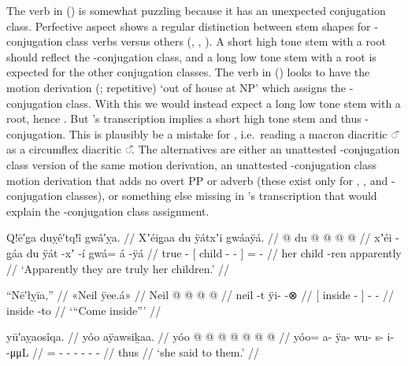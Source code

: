 The verb in (\lastx) is somewhat puzzling because it has an unexpected conjugation class.
Perfective aspect shows a regular distinction between stem shapes for -conjugation class verbs versus others (, , ).
A short high tone  stem with a  root should reflect the -conjugation class, and a long low tone  stem with a  root is expected for the other conjugation classes.
The verb in (\lastx) looks to have the motion derivation  (;  repetitive) ‘out of house at NP’ which assigns the -conjugation class.
With this we would instead expect a long low tone stem  with a  root, hence .
But \citeauthor{swanton:1909}’s transcription  implies a short high tone stem  and thus -conjugation.
This  is plausibly be a mistake for , i.e.\ reading a macron diacritic ◌̄ as a circumflex diacritic ◌̂.
The alternatives are either an unattested -conjugation class version of the same motion derivation, an unattested -conjugation class motion derivation that adds no overt PP or adverb (these exist only for , , and -conjugation classes), or something else missing in \citeauthor{swanton:1909}’s transcription that would explain the -conjugation class assignment.

\ex\label{ex:92-191-truly-her-children}%
%
\begingl
	\glpreamble	Q!ē′g̣a duỵê′tq!î gwâ′ỵa. //
	\glpreamble	Xʼéig̱aa du ÿátxʼi gwáaÿá. //
	\gla	{} @ {}
		{} du  @ {} @ {} {}
		 @ {} @ {} //
	\glb	xʼéi -g̱áa
		{} du ÿát -xʼ -í {}
		gwá= á -ÿá //
	\glc	true -
		{}[  child - - {}]
		=  - //
	\gld	{} {}
		{} her child -ren {} {}
		apparently\·  {} //
	\glft	‘Apparently they are truly her children.’
		//
\endgl
\xe

\ex\label{ex:92-192-come-inside}%
%
\begingl
	\glpreamble	“Nē′łỵīa,” //
	\glpreamble	«\!Neil ÿee.á\!» //
	\gla	{} Neil @ {} {}  @ {} @ {} @ {} //
	\glb	{} neil -t {} {} ÿi-  -⊗ //
	\glc	{}[ inside - {}] \· -  - //
	\gld	{} inside -to {}  {} {} {} //
	\glft	‘“Come inside”’
		//
\endgl
\xe

\ex\label{ex:92-193-she-said-to-them}%
%
\begingl
	\glpreamble	yū′aỵaosîqa. //
	\glpreamble	yóo aÿawsiḵaa. //
	\gla	yóo @  @ {} @ {} @ {} @ {} @ {} @ {} //
	\glb	yóo= a- ÿa- wu- s- i-  -μμL //
	\glc	{}= - - - - -  - //
	\gld	thus  {} {} {} {} {} {} //
	\glft	‘she said to them.’
		//
\endgl
\xe
		
